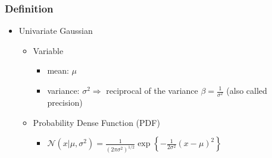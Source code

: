 \subsubsection{Definition}

\begin{itemize}
\item Univariate Gaussian
	\begin{itemize}
	\item Variable
		\begin{itemize}
		\item mean: $\mu$
		\item variance: $\sigma^2 \Rightarrow$ reciprocal of the variance $\beta = \frac 1 {\sigma^2}$ (also called precision)
		\end{itemize}
	\item Probability Dense Function (PDF)
		\begin{itemize}
		\item $\displaystyle \mathcal N(x|\mu, \sigma^2) = \frac 1 {(2\pi \sigma^2)^{1/2}} \exp \left\{ -\frac 1 {2\sigma^2}(x-\mu)^2 \right\}$
		

\end{itemize}
\end{itemize}
\end{itemize}
